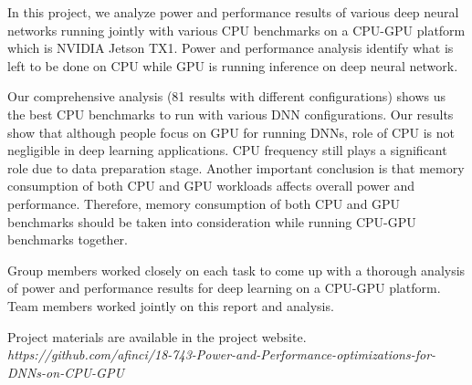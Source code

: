 In this project, we analyze power and performance results of various deep neural networks running jointly with various CPU benchmarks on a CPU-GPU platform which is NVIDIA Jetson TX1. Power and performance analysis identify what is left to be done on CPU while GPU is running inference on deep neural network. 

Our comprehensive analysis (81 results with different configurations) shows us the best CPU benchmarks to run with various DNN configurations. Our results show that although people focus on GPU for running DNNs, role of CPU is not negligible in deep learning applications. CPU frequency still plays a significant role due to data preparation stage. Another important conclusion is that memory consumption of both CPU and GPU workloads affects overall power and performance. Therefore, memory consumption of both CPU and GPU benchmarks should be taken into consideration while running CPU-GPU benchmarks together. 

Group members worked closely on each task to come up with a thorough analysis of power and performance results for deep learning on a CPU-GPU platform. Team members worked jointly on this report and analysis.  

Project materials are available in the project website. \textit{https://github.com/afinci/18-743-Power-and-Performance-optimizations-for-DNNs-on-CPU-GPU}